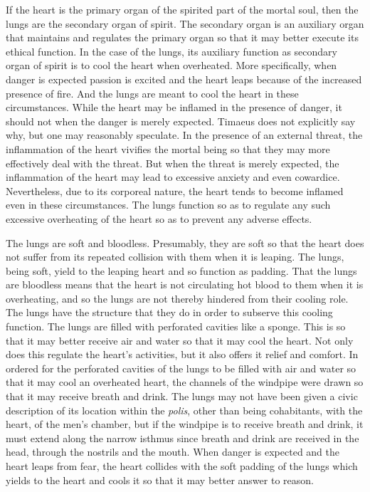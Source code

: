 If the heart is the primary organ of the spirited part of the mortal soul, then the lungs are the secondary organ of spirit. The secondary organ is an auxiliary organ that maintains and regulates the primary organ so that it may better execute its ethical function. In the case of the lungs, its auxiliary function as secondary organ of spirit is to cool the heart when overheated. More specifically, when danger is expected passion is excited and the heart leaps because of the increased presence of fire. And the lungs are meant to cool the heart in these circumstances. While the heart may be inflamed in the presence of danger, it should not when the danger is merely expected. Timaeus does not explicitly say why, but one may reasonably speculate. In the presence of an external threat, the inflammation of the heart vivifies the mortal being so that they may more effectively deal with the threat. But when the threat is merely expected, the inflammation of the heart may lead to excessive anxiety and even cowardice. Nevertheless, due to its corporeal nature, the heart tends to become inflamed even in these circumstances. The lungs function so as to regulate any such excessive overheating of the heart so as to prevent any adverse effects.

The lungs are soft and bloodless. Presumably, they are soft so that the heart does not suffer from its repeated collision with them when it is leaping. The lungs, being soft, yield to the leaping heart and so function as padding. That the lungs are bloodless means that the heart is not circulating hot blood to them when it is overheating, and so the lungs are not thereby hindered from their cooling role. The lungs have the structure that they do in order to subserve this cooling function. The lungs are filled with perforated cavities like a sponge. This is so that it may better receive air and water so that it may cool the heart. Not only does this regulate the heart's activities, but it also offers it relief and comfort. In ordered for the perforated cavities of the lungs to be filled with air and water so that it may cool an overheated heart, the channels of the windpipe were drawn so that it may receive breath and drink. The lungs may not have been given a civic description of its location within the \emph{polis}, other than being cohabitants, with the heart, of the men's chamber, but if the windpipe is to receive breath and drink, it must extend along the narrow isthmus since breath and drink are received in the head, through the nostrils and the mouth. When danger is expected and the heart leaps from fear, the heart collides with the soft padding of the lungs which yields to the heart and cools it so that it may better answer to reason.

